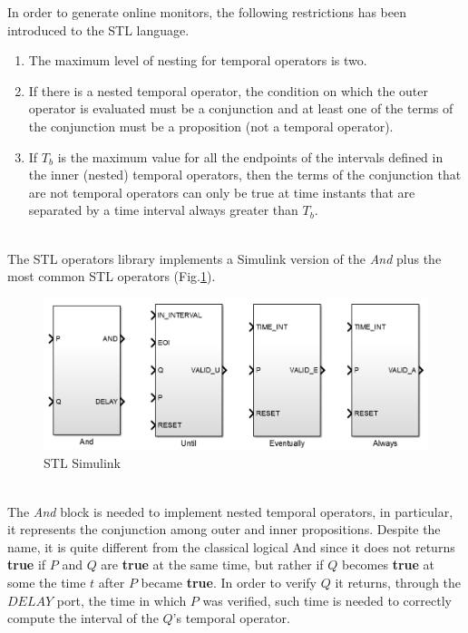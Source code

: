 In order to generate online monitors, the following restrictions has been introduced to the STL language.
\begin{enumerate}
\item The maximum level of nesting for temporal operators is two.
\item If there is a nested temporal operator, the condition on which the outer operator is evaluated must be a conjunction and at least one of the terms of the conjunction must be a proposition (not a temporal operator).
\item If $T_b$ is the maximum value for all the endpoints of the intervals defined in the inner (nested) temporal operators, then the terms of the conjunction that are not temporal operators can only be true at time instants that are separated by a time interval always greater than $T_b$. 
\end{enumerate}
\noindent
\\
The STL operators library implements a Simulink version of the \textit{And} plus the most common STL operators (Fig.\ref{fig:stlib}). 
\begin{figure}[!h]
	\centering 
     \includegraphics[width=.8\textwidth]{Figs/stlib.PNG} 
     \caption{STL Simulink} 
     \label{fig:stlib} 
\end{figure}
\noindent
\\
The \textit{And} block is needed to implement nested temporal operators, in particular, it represents the conjunction among outer and inner propositions. Despite the name, it is quite different from the classical logical And since it does not returns \textbf{true} if $P$ and $Q$ are \textbf{true} at the same time, but rather if $Q$ becomes \textbf{true} at some the time $t$ after $P$ became \textbf{true}. In order to verify $Q$ it returns, through the $DELAY$ port, the time in which $P$ was verified, such time is needed to correctly compute the interval of the $Q$'s temporal operator.  

